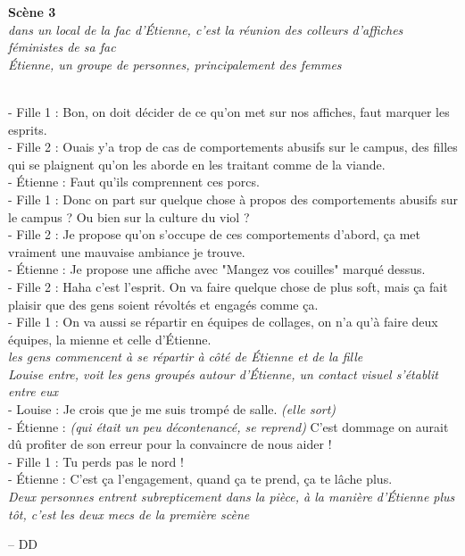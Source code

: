 \documentclass[french,12pt,amstex,a4paper]{article}
\begin{document}
\begin{center}
{\bf Scène 3}\\
{\it dans un local de la fac d'Étienne, c'est la réunion des colleurs d'affiches féministes de sa fac}\\
{\it Étienne, un groupe de personnes, principalement des femmes}
\end{center}
\\
- Fille 1 : Bon, on doit décider de ce qu'on met sur nos affiches, faut marquer les esprits.\\
- Fille 2 : Ouais y'a trop de cas de comportements abusifs sur le campus, des filles qui se plaignent qu'on les aborde en les traitant comme de la viande.\\
- Étienne : Faut qu'ils comprennent ces porcs.\\
- Fille 1 : Donc on part sur quelque chose à propos des comportements abusifs sur le campus ? Ou bien sur la culture du viol ?\\
- Fille 2 : Je propose qu'on s'occupe de ces comportements d'abord, ça met vraiment une mauvaise ambiance je trouve.\\
- Étienne : Je propose une affiche avec "Mangez vos couilles" marqué dessus.\\
- Fille 2 : Haha c'est l'esprit. On va faire quelque chose de plus soft, mais ça fait plaisir que des gens soient révoltés et engagés comme ça.\\
- Fille 1 : On va aussi se répartir en équipes de collages, on n'a qu'à faire deux équipes, la mienne et celle d'Étienne.\\
{\it les gens commencent à se répartir à côté de Étienne et de la fille}\\
{\it Louise entre, voit les gens groupés autour d'Étienne, un contact visuel s'établit entre eux}\\
- Louise : Je crois que je me suis trompé de salle. {\it (elle sort)}\\
- Étienne : {\it (qui était un peu décontenancé, se reprend)} C'est dommage on aurait dû profiter de son erreur pour la convaincre de nous aider !\\
- Fille 1 : Tu perds pas le nord !\\
- Étienne : C'est ça l'engagement, quand ça te prend, ça te lâche plus.\\
{\it Deux personnes entrent subrepticement dans la pièce, à la manière d'Étienne plus tôt, c'est les deux mecs de la première scène}\\

\iffalse
Idées : 
- dans une scène plus tard, à une réunion féministe de sa fac par exemple, la fille de la première scène sera présente et ça sera cringe.
- la chute peut-être que mec 1 et mec 2 sont comme ça aussi, genre tous les mecs sont pareils
\fi

\begin{flushright}
-- DD
\end{flushright}
\end{document}
